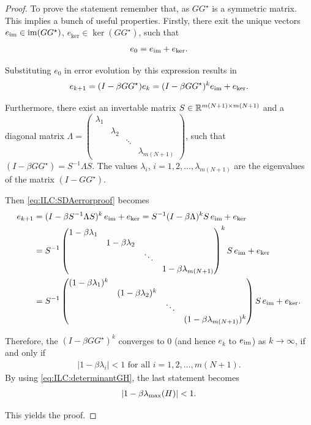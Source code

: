 \begin{proof}

To prove the statement remember that, as $GG^\star$ is a symmetric matrix. This implies a bunch of useful properties. 
Firstly, there exit the unique vectors 
$e_{\operatorname{im}} \in \operatorname{im}(G G^\star)$, $e_{\ker} \in \ker(G G^\star)$, such that 
\begin{align}
e_0 = e_{\operatorname{im}} + e_{\ker}.
\end{align}


Substituting $e_0$ in error evolution by this expression results in
\begin{align}
\label{eq:ILC:SDAerrorproof}
e_{k+1} = (I - \beta G G^\star) e_k = (I - \beta G G^\star)^k e_{\operatorname{im}} + e_{\ker}.
\end{align}

Furthermore, there exist an invertable matrix $S \in {\mathbb{R}}^{m (N+1) \times m (N+1)}$ and a diagonal matrix $\Lambda  =\begin{pmatrix}
\lambda_1 & & & \\ & \lambda_2 & & \\ & & \ddots & \\ & & & \lambda_{m(N+1)}\end{pmatrix}$, such that $(I - \beta G G^\star) = S^{-1}\Lambda S$. The values $\lambda_i$, $i = 1,2,\dots,\lambda_{m(N+1)}$ are the eigenvalues of the matrix 
$(I - G G^\star)$. 

Then \eqref{eq:ILC:SDAerrorproof} becomes 
\begin{subequations}
	\begin{align}
e_{k+1} &= (I - \beta S^{-1}\Lambda S)^k \, e_{\operatorname{im}} + e_{\ker} =  S^{-1}(I - \beta \Lambda)^k S \, e_{\operatorname{im}} + e_{\ker} 
\\
&= S^{-1}
\begin{pmatrix}
1 - \beta \lambda_1 & & & \\
& 1 - \beta \lambda_2 & & \\
& & \ddots & \\
& & & 1 - \beta \lambda_{m(N+1)}
\end{pmatrix}^k
 S \, e_{\operatorname{im}} + e_{\ker} 
 \\
 &= S^{-1}
 \begin{pmatrix}
 (1 - \beta \lambda_1)^k & & & \\
 & (1 - \beta \lambda_2)^k & & \\
 & & \ddots & \\
 & & & (1 - \beta \lambda_{m(N+1)})^k
 \end{pmatrix}
 S \, e_{\operatorname{im}} + e_{\ker}.
\end{align}
\end{subequations}

Therefore, the $(I - \beta G G^\star)^k$ converges to 0 (and hence $e_k$ to $e_{\operatorname{im}}$) as $k \to \infty$, if and only if
\begin{align}
|1 - \beta \lambda_i|<1 \text{ for all } i = 1,2, \dots, m(N+1).
\end{align}
By using \eqref{eq:ILC:determinantGH}, the last statement becomes 
\begin{align}
|1 - \beta \lambda_{\mathrm{max}}(H)|<1. 
\end{align}

This yields the proof. 
\end{proof}
